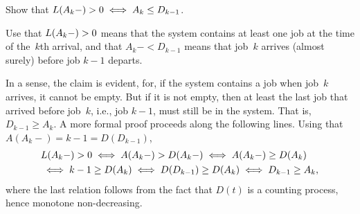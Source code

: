 \documentclass[stochastic-or.tex]{subfiles}
\begin{document}






\begin{exercise}
Show  that $L(A_k-)>0 \iff A_k \leq D_{k-1}$.
\begin{hint} Use that $L(A_k-)>0$ means that the system contains at least one job at the time of the~$k$th arrival, and that $A_k- < D_{k-1}$ means that job~$k$ arrives (almost surely) before job $k-1$ departs.
\end{hint}
\begin{solution} In a sense, the claim is evident, for, if the system contains a job when job~$k$ arrives, it cannot be empty.
 But if it is not empty, then at least the last job that arrived before job~$k$, i.e., job $k-1$, must still be in the system.
 That is, $D_{k-1} \geq   A_k$.
 A more formal proof proceeds along the following lines.
 Using that $A(A_k-) = k-1 = D(D_{k-1})$,
 \begin{equation*}
 \begin{split}
& L(A_k-) > 0 \iff A(A_k-) > D(A_k-) \iff A(A_{k}-) \geq D(A_k)  \\
   &\iff k -1 \geq  D(A_k) \iff D(D_{k-1}) \geq  D(A_k) \iff  D_{k-1} \geq A_{k},
 \end{split}
 \end{equation*}
 where the last relation follows from the fact that $D(t)$ is a
 counting process, hence monotone non-decreasing.
\end{solution}
\end{exercise}
\end{document}
